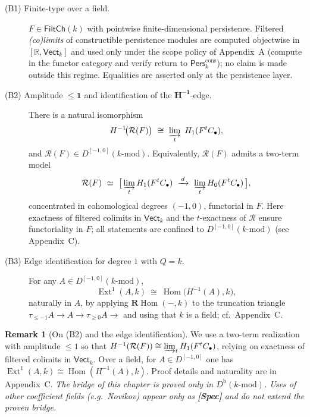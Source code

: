 \documentclass[11pt]{article}
\DeclareMathOperator{\Ext}{Ext}
\DeclareMathOperator{\Hom}{Hom}
\newcommand{\Pers}{\mathsf{Pers}}
\numberwithin{equation}{section}
\theoremstyle{definition}
\newtheorem{remark}[theorem]{Remark}
\begin{document}
\begin{description}
\item[\normalfont (B1) Finite-type over a field.]
\(F\in\mathsf{FiltCh}(k)\) with pointwise finite-dimensional persistence. Filtered \emph{(co)limits} of constructible persistence modules are computed objectwise in \([\mathbb{R},\mathsf{Vect}_k]\) and used only under the scope policy of Appendix~A (compute in the functor category and verify return to \(\Pers^{\mathrm{cons}}_k\)); no claim is made outside this regime. Equalities are asserted only at the persistence layer.

\item[\normalfont (B2) Amplitude \(\boldsymbol{\le 1}\) and identification of the \(\boldsymbol{H^{-1}}\)-edge.]
There is a natural isomorphism
\[
H^{-1}\!\big(\mathcal{R}(F)\big)\ \cong\ \varinjlim_{t}\ H_1(F^{t}C_\bullet),
\]
and \(\mathcal{R}(F)\in D^{[-1,0]}(k\text{-mod})\).
Equivalently, \(\mathcal{R}(F)\) admits a two-term model
\[
\mathcal{R}(F)\ \simeq\ \bigl[\, \varinjlim_{t} H_1(F^{t}C_\bullet)\ \xrightarrow{\,d\,}\ \varinjlim_{t} H_0(F^{t}C_\bullet)\, \bigr],
\]
concentrated in cohomological degrees \((-1,0)\), functorial in \(F\).
Here exactness of filtered colimits in \(\mathsf{Vect}_k\) and the \(t\)-exactness of \(\mathcal{R}\) ensure functoriality in \(F\); all statements are confined to \(D^{[-1,0]}(k\text{-mod})\) (see Appendix~C).

\item[\normalfont (B3) Edge identification for degree \(1\) with \(Q=k\).]
For any \(A\in D^{[-1,0]}(k\text{-mod})\),
\[
\Ext^1(A,k)\ \cong\ \Hom\!\big(H^{-1}(A),k\big),
\]
naturally in \(A\), by applying \(\mathbf{R}\!\operatorname{Hom}(-,k)\) to the truncation triangle \(\tau_{\le -1}A\to A\to \tau_{\ge 0}A\to\) and using that \(k\) is a field; cf.\ Appendix~C.
\end{description}

\begin{remark}[On (B2) and the edge identification]\label{rk:B2-edge}
We use a two-term realization with amplitude \(\le 1\) so that \(H^{-1}(\mathcal{R}(F))\cong \varinjlim_t H_1(F^tC_\bullet)\), relying on exactness of filtered colimits in \(\mathsf{Vect}_k\). Over a field, for \(A\in D^{[-1,0]}\) one has \(\Ext^1(A,k)\cong \Hom(H^{-1}(A),k)\). Proof details and naturality are in Appendix~C. \emph{The bridge of this chapter is proved only in \(D^{\mathrm{b}}(k\text{-mod})\). Uses of other coefficient fields (e.g.\ Novikov) appear only as \textbf{[Spec]} and do not extend the proven bridge.}
\end{remark}
\end{document}
